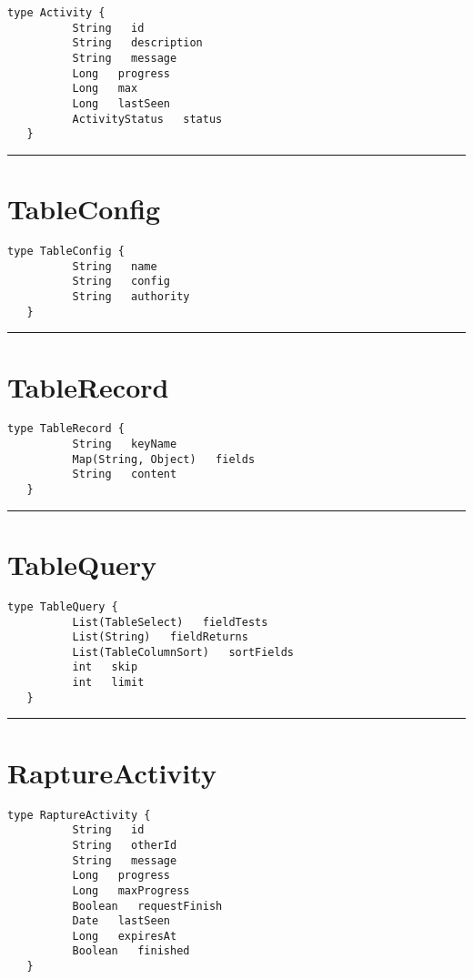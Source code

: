 \begin{lstlisting}[style=nonumbers]
   type Activity {
          String   id
          String   description
          String   message
          Long   progress
          Long   max
          Long   lastSeen
          ActivityStatus   status
   }
\end{lstlisting}

\rule{12cm}{2pt}
\section{TableConfig}
\label{type:TableConfig}

\begin{lstlisting}[style=nonumbers]
   type TableConfig {
          String   name
          String   config
          String   authority
   }
\end{lstlisting}

\rule{12cm}{2pt}
\section{TableRecord}
\label{type:TableRecord}

\begin{lstlisting}[style=nonumbers]
   type TableRecord {
          String   keyName
          Map(String, Object)   fields
          String   content
   }
\end{lstlisting}

\rule{12cm}{2pt}
\section{TableQuery}
\label{type:TableQuery}

\begin{lstlisting}[style=nonumbers]
   type TableQuery {
          List(TableSelect)   fieldTests
          List(String)   fieldReturns
          List(TableColumnSort)   sortFields
          int   skip
          int   limit
   }
\end{lstlisting}

\rule{12cm}{2pt}
\section{RaptureActivity}
\label{type:RaptureActivity}

\begin{lstlisting}[style=nonumbers]
   type RaptureActivity {
          String   id
          String   otherId
          String   message
          Long   progress
          Long   maxProgress
          Boolean   requestFinish
          Date   lastSeen
          Long   expiresAt
          Boolean   finished
   }
\end{lstlisting}

